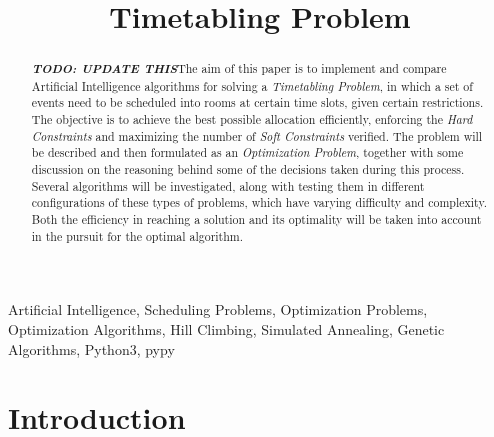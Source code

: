 \documentclass[conference]{IEEEtran}
\begin{document}
\title{Timetabling Problem}

\author{
\and
{}
\and
{}
}

\maketitle

\begin{abstract}
\textbf{\textit{TODO: UPDATE THIS}}The aim of this paper is to implement and compare Artificial Intelligence algorithms for solving a \textit{Timetabling Problem}, in which a set of events need to be scheduled into rooms at certain time slots, given certain restrictions. The objective is to achieve the best possible allocation efficiently, enforcing the \textit{Hard Constraints} and maximizing the number of \textit{Soft Constraints} verified.
The problem will be described and then formulated as an \textit{Optimization Problem}, together with some discussion on the reasoning behind some of the decisions taken during this process.
Several algorithms will be investigated, along with testing them in different configurations of these types of problems, which have varying difficulty and complexity. Both the efficiency in reaching a solution and its optimality will be taken into account in the pursuit for the optimal algorithm.
\end{abstract}

\begin{IEEEkeywords}
Artificial Intelligence, Scheduling Problems, Optimization Problems, Optimization Algorithms, Hill Climbing, Simulated Annealing, Genetic Algorithms, Python3, pypy
\end{IEEEkeywords}

\section{Introduction}
\end{document}
